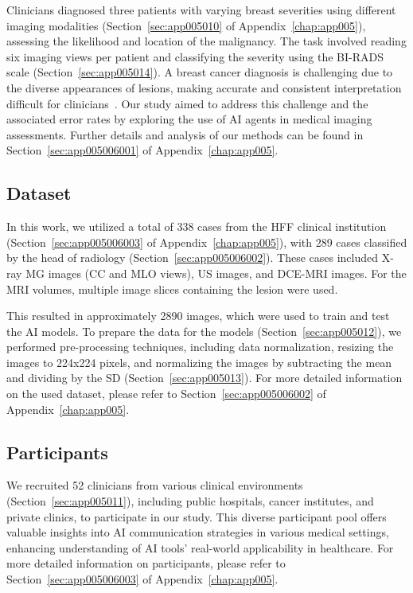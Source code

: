 Clinicians diagnosed three patients with varying breast severities using different imaging modalities (Section~\ref{sec:app005010} of Appendix~\ref{chap:app005}), assessing the likelihood and location of the malignancy.
The task involved reading six imaging views per patient and classifying the severity using the \ac{BI-RADS} scale (Section~\ref{sec:app005014}).
A breast cancer diagnosis is challenging due to the diverse appearances of lesions, making accurate and consistent interpretation difficult for clinicians~\cite{CALISTO2022102285}.
Our study aimed to address this challenge and the associated error rates by exploring the use of \ac{AI} agents in medical imaging assessments.
Further details and analysis of our methods can be found in Section~\ref{sec:app005006001} of Appendix~\ref{chap:app005}.

\subsection{Dataset}
\label{sec:chap006005002}

In this work, we utilized a total of 338 cases from the \acs{HFF} clinical institution (Section~\ref{sec:app005006003} of Appendix~\ref{chap:app005}), with 289 cases classified by the head of radiology (Section~\ref{sec:app005006002}).
These cases included X-ray \acs{MG} images (\acs{CC} and \acs{MLO} views), \acs{US} images, and \acs{DCE-MRI} images.
For the \acs{MRI} volumes, multiple image slices containing the lesion were used.

This resulted in approximately 2890 images, which were used to train and test the \ac{AI} models.
To prepare the data for the models (Section~\ref{sec:app005012}), we performed pre-processing techniques, including data normalization, resizing the images to 224x224 pixels, and normalizing the images by subtracting the mean and dividing by the \acs{SD} (Section~\ref{sec:app005013}).
For more detailed information on the used dataset, please refer to Section~\ref{sec:app005006002} of Appendix~\ref{chap:app005}.

\subsection{Participants}
\label{sec:chap006005003}

\textcolor{revised}{We recruited 52 clinicians from various clinical environments (Section~\ref{sec:app005011}), including public hospitals, cancer institutes, and private clinics, to participate in our study.
This diverse participant pool offers valuable insights into \ac{AI} communication strategies in various medical settings, enhancing understanding of \ac{AI} tools' real-world applicability in healthcare.
For more detailed information on participants, please refer to Section~\ref{sec:app005006003} of Appendix~\ref{chap:app005}.}


